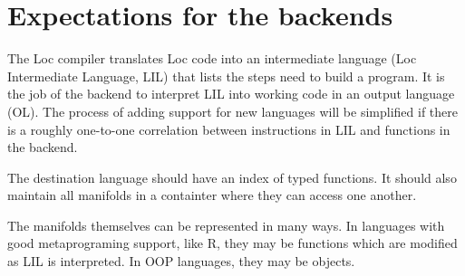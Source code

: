 \documentclass[12pt]{article}
\begin{document}
\section{Expectations for the backends}

The Loc compiler translates Loc code into an intermediate language (Loc
Intermediate Language, LIL) that lists the steps need to build a program. It
is the job of the backend to interpret LIL into working code in an output
language (OL). The process of adding support for new languages will be
simplified if there is a roughly one-to-one correlation between instructions in
LIL and functions in the backend.

The destination language should have an index of typed functions. It should
also maintain all manifolds in a containter where they can access one another.

The manifolds themselves can be represented in many ways. In languages with
good metaprograming support, like R, they may be functions which are modified
as LIL is interpreted. In OOP languages, they may be objects.
\end{document}
